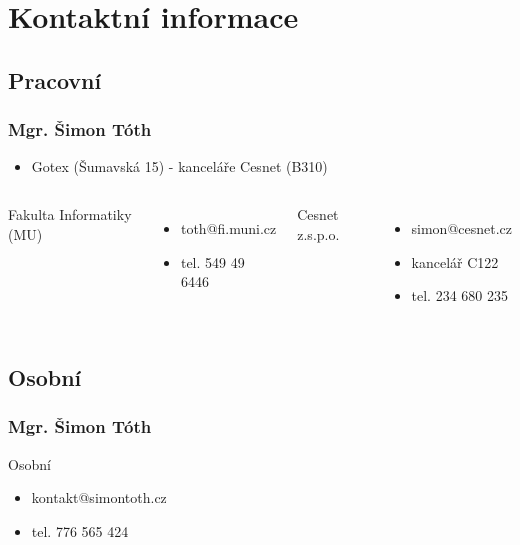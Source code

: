 \section{Kontaktní informace}
	\subsection{Pracovní}

\begin{frame}[label=kontakt-simontoth]
	\frametitle{Mgr. Šimon Tóth}
	\begin{itemize}
		\item{Gotex (Šumavská 15) - kanceláře Cesnet (B310)}
	\end{itemize}

	\begin{columns}
		Fakulta Informatiky (MU)
		\begin{itemize}
			\item{toth@fi.muni.cz}
			\item{tel. 549 49 6446}
		\end{itemize}

		Cesnet z.s.p.o.
		\begin{itemize}
			\item{simon@cesnet.cz}
			\item{kancelář C122}
			\item{tel. 234 680 235}
		\end{itemize}

	\end{columns}
\end{frame}

	\subsection{Osobní}

\begin{frame}
	\frametitle{Mgr. Šimon Tóth}
		Osobní
		\begin{itemize}
			\item{kontakt@simontoth.cz}
			\item{tel. 776 565 424}
		\end{itemize}
\end{frame}


